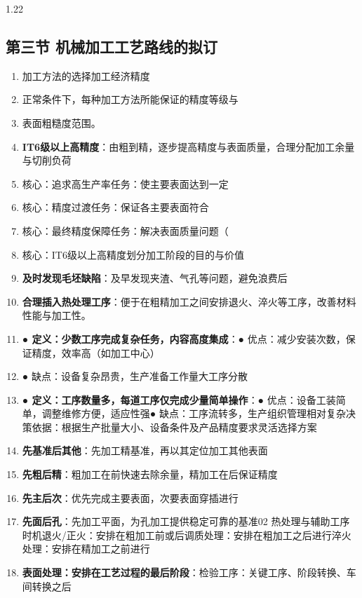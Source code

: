 \documentclass[12pt,a4paper]{article}
\begin{document}
\begin{spacing}{1.22}
\subsection{第三节 机械加工工艺路线的拟订}
\begin{tcolorbox}[colback=yellow!6,colframe=red!55!black,title=重点,left=1mm,right=1mm]
\begin{enumerate}[leftmargin=2.2em,label=\arabic*.]
  \item 加工方法的选择加工经济精度
  \item 正常条件下，每种加工方法所能保证的精度等级与
  \item 表面粗糙度范围。
  \item \textbf{IT6级以上高精度}：由粗到精，逐步提高精度与表面质量，合理分配加工余量与切削负荷
  \item 核心：追求高生产率任务：使主要表面达到一定
  \item 核心：精度过渡任务：保证各主要表面符合
  \item 核心：最终精度保障任务：解决表面质量问题（
  \item 核心：IT6级以上高精度划分加工阶段的目的与价值
  \item \textbf{及时发现毛坯缺陷}：及早发现夹渣、气孔等问题，避免浪费后
  \item \textbf{合理插入热处理工序}：便于在粗精加工之间安排退火、淬火等工序，改善材料性能与加工性。
  \item \textbf{● 定义：少数工序完成复杂任务，内容高度集成}：● 优点：减少安装次数，保证精度，效率高（如加工中心）
  \item ● 缺点：设备复杂昂贵，生产准备工作量大工序分散
  \item \textbf{● 定义：工序数量多，每道工序仅完成少量简单操作}：● 优点：设备工装简单，调整维修方便，适应性强● 缺点：工序流转多，生产组织管理相对复杂决策依据：根据生产批量大小、设备条件及产品精度要求灵活选择方案
  \item \textbf{先基准后其他}：先加工精基准，再以其定位加工其他表面
  \item \textbf{先粗后精}：粗加工在前快速去除余量，精加工在后保证精度
  \item \textbf{先主后次}：优先完成主要表面，次要表面穿插进行
  \item \textbf{先面后孔}：先加工平面，为孔加工提供稳定可靠的基准02 热处理与辅助工序时机退火/正火：安排在粗加工前或后调质处理：安排在粗加工之后进行淬火处理：安排在精加工之前进行
  \item \textbf{表面处理：安排在工艺过程的最后阶段}：检验工序：关键工序、阶段转换、车间转换之后
\end{enumerate}

\end{tcolorbox}
\end{spacing}
\end{document}

